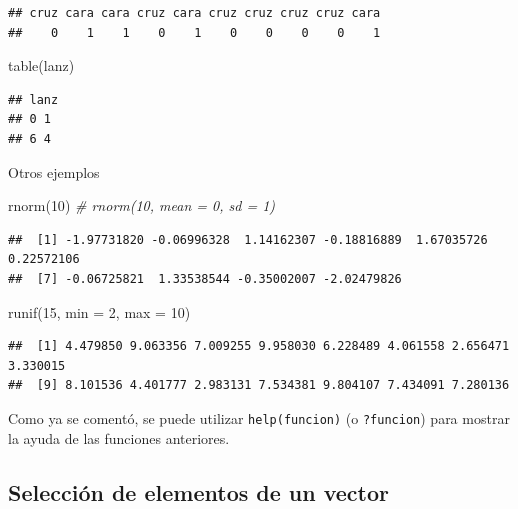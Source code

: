\documentclass[
]{book}
\newenvironment{Shaded}{\begin{snugshade}}{\end{snugshade}}
\newcommand{\AttributeTok}[1]{\textcolor[rgb]{0.77,0.63,0.00}{#1}}
\newcommand{\CommentTok}[1]{\textcolor[rgb]{0.56,0.35,0.01}{\textit{#1}}}
\newcommand{\DecValTok}[1]{\textcolor[rgb]{0.00,0.00,0.81}{#1}}
\newcommand{\FunctionTok}[1]{\textcolor[rgb]{0.00,0.00,0.00}{#1}}
\newcommand{\NormalTok}[1]{#1}
\theoremstyle{break}
\theoremstyle{nonumberplain}
\begin{document}
\begin{verbatim}
## cruz cara cara cruz cara cruz cruz cruz cruz cara 
##    0    1    1    0    1    0    0    0    0    1
\end{verbatim}

\begin{Shaded}
\begin{Highlighting}[]
\FunctionTok{table}\NormalTok{(lanz)}
\end{Highlighting}
\end{Shaded}

\begin{verbatim}
## lanz
## 0 1 
## 6 4
\end{verbatim}

Otros ejemplos

\begin{Shaded}
\begin{Highlighting}[]
\FunctionTok{rnorm}\NormalTok{(}\DecValTok{10}\NormalTok{)  }\CommentTok{\# rnorm(10, mean = 0, sd = 1)}
\end{Highlighting}
\end{Shaded}

\begin{verbatim}
##  [1] -1.97731820 -0.06996328  1.14162307 -0.18816889  1.67035726  0.22572106
##  [7] -0.06725821  1.33538544 -0.35002007 -2.02479826
\end{verbatim}

\begin{Shaded}
\begin{Highlighting}[]
\FunctionTok{runif}\NormalTok{(}\DecValTok{15}\NormalTok{, }\AttributeTok{min =} \DecValTok{2}\NormalTok{, }\AttributeTok{max =} \DecValTok{10}\NormalTok{)}
\end{Highlighting}
\end{Shaded}

\begin{verbatim}
##  [1] 4.479850 9.063356 7.009255 9.958030 6.228489 4.061558 2.656471 3.330015
##  [9] 8.101536 4.401777 2.983131 7.534381 9.804107 7.434091 7.280136
\end{verbatim}

Como ya se comentó, se puede utilizar \texttt{help(funcion)} (o \texttt{?funcion}) para mostrar la ayuda de las funciones anteriores.

\hypertarget{selecciuxf3n-de-elementos-de-un-vector}{%
\subsection{Selección de elementos de un vector}\label{selecciuxf3n-de-elementos-de-un-vector}}
\end{document}
